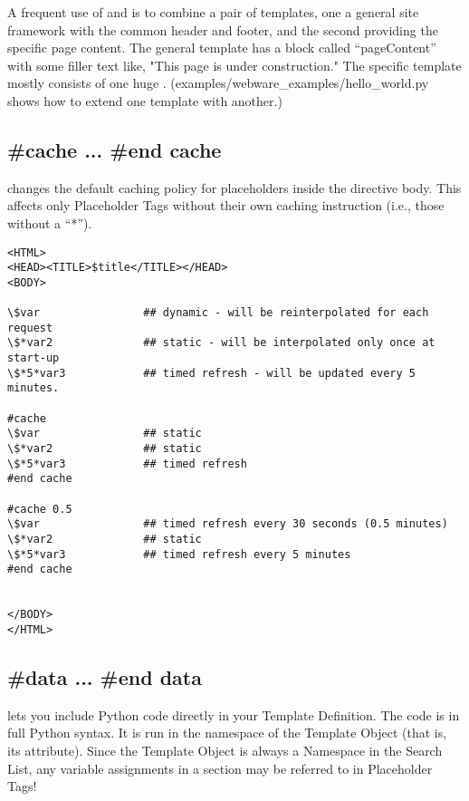 A frequent use of  and  is to combine a pair of
templates, one a general site framework with the common header and footer, and
the second providing the specific page content.  The general template has a
block called ``pageContent'' with some filler text like, "This page is under
construction."  The specific template mostly consists of one huge
.  (examples/webware\_examples/hello\_world.py shows how to
extend one template with another.)


\subsection{\#cache ... \#end cache}

 changes the default caching policy for placeholders inside the
directive body.  This affects only Placeholder Tags without their own caching
instruction (i.e., those without a ``*'').

\begin{verbatim}
<HTML>
<HEAD><TITLE>$title</TITLE></HEAD>
<BODY>

\$var                ## dynamic - will be reinterpolated for each request
\$*var2              ## static - will be interpolated only once at start-up
\$*5*var3            ## timed refresh - will be updated every 5 minutes.

#cache
\$var                ## static
\$*var2              ## static
\$*5*var3            ## timed refresh
#end cache

#cache 0.5
\$var                ## timed refresh every 30 seconds (0.5 minutes)
\$*var2              ## static
\$*5*var3            ## timed refresh every 5 minutes
#end cache


</BODY>
</HTML>
\end{verbatim}


\subsection{\#data ... \#end data}

 lets you include Python code directly in your Template 
Definition.  The code is in full Python syntax.  It is run in the namespace of
the Template Object (that is, its  attribute).  Since the Template
Object is always a Namespace in the Search List, any variable assignments in a
 section may be referred to in Placeholder Tags!

